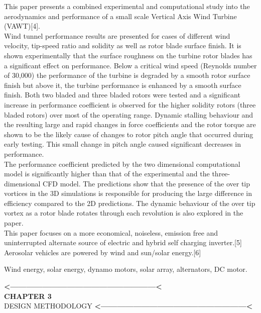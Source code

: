 \documentclass[a4paper,12pt]{article}
\begin{document}
This paper presents a combined experimental
and computational study into the aerodynamics
and performance of a small scale Vertical Axis
Wind Turbine (VAWT)[4].\\

Wind tunnel performance results are presented for cases of different wind velocity, tip-speed ratio and solidity as well as rotor blade surface finish. It is shown experimentally that the surface roughness on the turbine rotor blades has a significant effect on performance. Below a critical wind speed (Reynolds number of 30,000) the performance of the turbine is degraded by a smooth rotor surface finish but above it, the turbine performance is enhanced by a smooth surface finish. Both two bladed and three bladed rotors were tested and a significant increase in performance coefficient is observed for the higher solidity rotors (three bladed rotors) over most of the operating range. Dynamic stalling behaviour and the resulting large and rapid changes in force coefficients and the rotor torque are shown to be the likely cause of changes to rotor pitch angle that occurred during early testing. This small change in pitch angle caused significant decreases in performance.\\

The performance coefficient predicted by the two dimensional computational model is significantly higher than that of the experimental and the three-dimensional CFD model. The predictions show that the presence of the over tip vortices in the 3D simulations is responsible for producing the large difference in efficiency compared to the 2D predictions. The dynamic behaviour of the over tip vortex as a rotor blade rotates through each revolution is also explored in the paper.\\



This paper focuses on a more economical,
noiseless, emission free and uninterrupted
alternate source of electric and hybrid self
charging inverter.[5]\\

Aerosolar vehicles are powered by wind and
sun/solar energy.[6]

Wind energy, solar energy, dynamo motors,
solar array, alternators, DC motor.\\

\newpage
\thispagestyle{empty}
\vspace*{0.25\textheight}
\begin{center}
\begin{center}
{\bfseries\LARGE <------------------------------------------------------<}\\
{\bfseries\LARGE CHAPTER 3}\\[2cm]


{\scshape\Huge DESIGN METHODOLOGY}
{\bfseries\LARGE <------------------------------------------------------<}
\end{center}
\end{center}
\newpage
\end{document}
